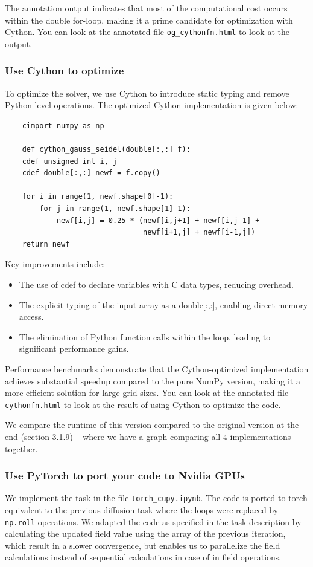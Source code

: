 \documentclass[a4paper,12pt]{article}
\begin{document}
The annotation output indicates that most of the computational cost occurs within the double for-loop, making it a prime candidate for optimization with Cython. You can look at the annotated file \verb|og_cythonfn.html| to look at the output. 

\subsubsection{Use Cython to optimize}

To optimize the solver, we use Cython to introduce static typing and remove Python-level operations. The optimized Cython implementation is given below:

\begin{verbatim}
    cimport numpy as np

    def cython_gauss_seidel(double[:,:] f):
    cdef unsigned int i, j
    cdef double[:,:] newf = f.copy()

    for i in range(1, newf.shape[0]-1):
        for j in range(1, newf.shape[1]-1):
            newf[i,j] = 0.25 * (newf[i,j+1] + newf[i,j-1] +
                                newf[i+1,j] + newf[i-1,j])
    return newf
\end{verbatim}

Key improvements include:
\begin{itemize}
    \item The use of cdef to declare variables with C data types, reducing overhead.
    \item The explicit typing of the input array as a double[:,:], enabling direct memory access.
    \item The elimination of Python function calls within the loop, leading to significant performance gains.
\end{itemize}

Performance benchmarks demonstrate that the Cython-optimized implementation achieves substantial speedup compared to the pure NumPy version, making it a more efficient solution for large grid sizes. You can look at the annotated file \verb|cythonfn.html| to look at the result of using Cython to optimize the code.

We compare the runtime of this version compared to the original version at the end (section 3.1.9) -- where we have a graph comparing all 4 implementations together. 

\subsubsection{Use PyTorch to port your code to Nvidia GPUs}
We implement the task in the file \verb|torch_cupy.ipynb|. The code is ported to torch equivalent to the previous diffusion task
where the loops were replaced by \verb|np.roll| operations. We adapted the code as specified in the task description by calculating the
updated field value using the array of the previous iteration, which result in a slower convergence, but enables us to parallelize the field calculations
instead of sequential calculations in case of in field operations.
\end{document}
